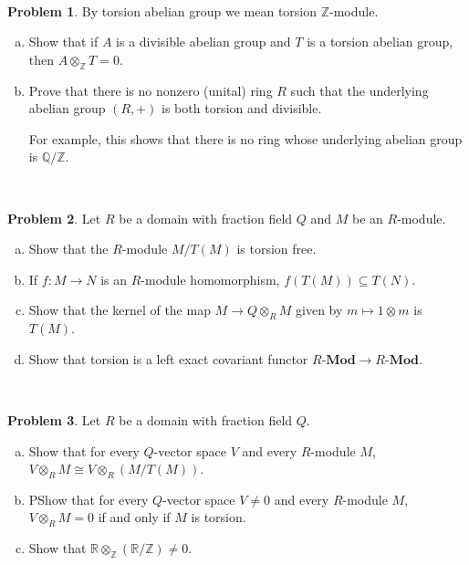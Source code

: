 \documentclass[11pt]{article}
\newcommand{\Q}{\mathbb{Q}}
\newcommand{\Z}{\mathbb{Z}}
\theoremstyle{definition}
\newtheorem{problem}{Problem}
\begin{document}
\vspace{2em}

\noindent
{} 


\



\begin{problem} By torsion abelian group we mean torsion $\Z$-module.
	\begin{enumerate}[a)]
		\item Show that if $A$ is a divisible abelian group and $T$ is a torsion abelian group, then $A \otimes_\Z T = 0$.
		\item Prove that there is no nonzero (unital) ring $R$ such that the underlying abelian group $(R,+)$ is both torsion and divisible. 
		
		\noindent
		For example, this shows that there is no ring whose underlying abelian group is $\Q/\Z$.
	\end{enumerate}
\end{problem}


\


\begin{problem} Let $R$ be a domain with fraction field $Q$ and $M$ be an $R$-module.
	\begin{enumerate}[a)]
		\item Show that the $R$-module $M/T(M)$ is torsion free.
		\item If $f\!: M \longrightarrow N$ is an $R$-module homomorphism, $f(T(M)) \subseteq T(N)$.
		\item Show that the kernel of the map $M \longrightarrow Q \otimes_R M$ given by $m \mapsto 1 \otimes m$ is $T(M)$.		
		\item Show that torsion is a left exact covariant functor $R\textbf{-Mod} \to R\textbf{-Mod}$.
	\end{enumerate}
\end{problem}

\

\begin{problem}
	Let $R$ be a domain with fraction field $Q$.
	\begin{enumerate}[a)]
		\item Show that for every $Q$-vector space $V$ and every $R$-module $M$, $V \otimes_R M \cong V \otimes_R (M/T(M))$.
		\item PShow that for every $Q$-vector space $V \neq 0$ and every $R$-module $M$, $V \otimes_R M = 0$ if and only if $M$ is torsion.
		\item Show that $\mathbb{R} \otimes_\mathbb{Z} (\mathbb{R} / \mathbb{Z}) \neq 0$.
	\end{enumerate}
\end{problem}
\end{document}

